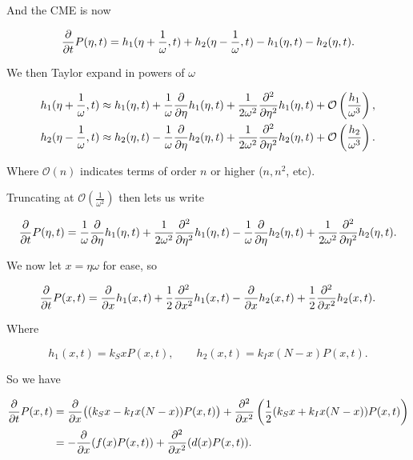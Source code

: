 \documentclass[12pt,a4paper,openany,twoside]{book}
\def \p {\partial}
\newcommand{\pd}[2]{\mathchoice{\frac{\p #1}{\p #2}}{\p #1/\p #2}{\p #1/\p #2}{\p #1/\p #2}}
\newcommand{\pdd}[2]{\mathchoice{\frac{\p^2 #1}{\p #2^2}}{\p^2 #1/\p #2^2}{\p^2 #1/\p #2^2}{\p^2 #1/\p #2^2}}
\begin{document}
And the CME is now

\begin{equation}
	\pd {} {t} P(\eta, t) = h_1 (\eta + \frac 1 \omega, t) + h_2 (\eta - \frac 1 \omega, t) - h_1 (\eta, t) - h_2 (\eta, t).
\end{equation}

We then Taylor expand in powers of $\omega$

\begin{align}
	h_1 (\eta + \frac 1 \omega, t) &\approx h_1 (\eta, t) + \frac 1 \omega \pd {} {\eta} h_1 (\eta, t) + \frac 1 {2 \omega^2} \pdd {} {\eta} h_1 (\eta, t) + \mathcal{O} \left(\frac {h_1} {\omega^3}\right), \\
	h_2 (\eta - \frac 1 \omega, t) &\approx h_2 (\eta, t) - \frac 1 \omega \pd {} {\eta} h_2 (\eta, t) + \frac 1 {2 \omega^2} \pdd {} {\eta} h_2 (\eta, t) + \mathcal{O} \left(\frac {h_2} {\omega^3}\right).
\end{align}

Where $\mathcal {O} (n)$ indicates terms of order $n$ or higher ($n, n^2$, etc).

Truncating at $\mathcal{O} (\frac 1 {\omega^2})$ then lets us write

\begin{equation}
	\pd {} {t} P(\eta, t) = \frac 1 \omega \pd {} {\eta} h_1(\eta, t) + \frac {1} {2 \omega^2} \pdd {} {\eta} h_1(\eta, t) - \frac 1 \omega \pd {} {\eta} h_2(\eta, t) + \frac 1 {2 \omega^2} \pdd {} {\eta} h_2(\eta, t).
\end{equation}

We now let $x = \eta \omega$ for ease, so

\begin{equation}
	\pd {} {t} P(x, t) = \pd {} {x} h_1(x, t) + \frac 1 2 \pdd {} {x} h_1(x, t) - \pd {} {x} h_2(x, t) + \frac 1 2 \pdd {} {x} h_2(x, t).
\end{equation}

Where

\begin{equation}
	h_1(x, t) = k_S x P(x, t), \qquad h_2(x, t) = k_I x (N-x) P(x, t).
\end{equation}

So we have

\begin{align}
	\pd {} {t} P(x, t) &= \pd {} {x} \big((k_S x - k_I x (N-x)) P(x, t)\big) + \pdd {} {x} \left(\frac {1} {2}(k_S x + k_I x (N-x)) P(x, t)\right) \notag \\
	&= - \pd {} {x} (f(x) P(x, t)) + \pdd {} x (d(x) P(x, t)). \label{ChemFPEq}
\end{align}
\end{document}
